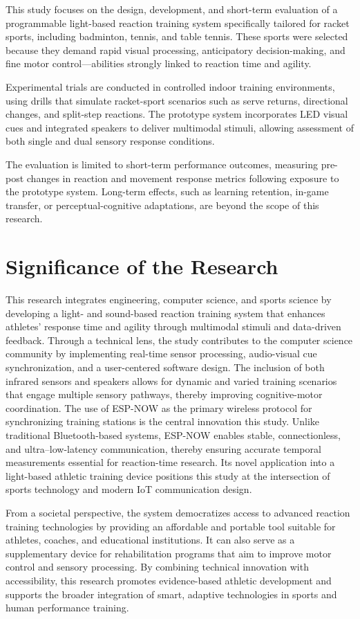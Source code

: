 	This study focuses on the design, development, and short-term evaluation of a programmable light-based reaction training system specifically tailored for racket sports, including badminton, tennis, and table tennis. These sports were selected because they demand rapid visual processing, anticipatory decision-making, and fine motor control—abilities strongly linked to reaction time and agility.
	
	Experimental trials are conducted in controlled indoor training environments, using drills that simulate racket-sport scenarios such as serve returns, directional changes, and split-step reactions. The prototype system incorporates LED visual cues and integrated speakers to deliver multimodal stimuli, allowing assessment of both single and dual sensory response conditions.
	
	The evaluation is limited to short-term performance outcomes, measuring pre-post changes in reaction and movement response metrics following exposure to the prototype system. Long-term effects, such as learning retention, in-game transfer, or perceptual-cognitive adaptations, are beyond the scope of this research.


\section{Significance of the Research}
\label{sec:significance}

	This research integrates engineering, computer science, and sports science by developing a light- and sound-based reaction training system that enhances athletes’ response time and agility through multimodal stimuli and data-driven feedback. Through a technical lens, the study contributes to the computer science community by implementing real-time sensor processing, audio-visual cue synchronization, and a user-centered software design. The inclusion of both infrared sensors and speakers allows for dynamic and varied training scenarios that engage multiple sensory pathways, thereby improving cognitive-motor coordination. The use of ESP-NOW as the primary wireless protocol for synchronizing training stations is the central innovation this study. Unlike traditional Bluetooth-based systems, ESP-NOW enables stable, connectionless, and ultra–low-latency communication, thereby ensuring accurate temporal measurements essential for reaction-time research. Its novel application into a light-based athletic training device positions this study at the intersection of sports technology and modern IoT communication design.
	
	From a societal perspective, the system democratizes access to advanced reaction training technologies by providing an affordable and portable tool suitable for athletes, coaches, and educational institutions. It can also serve as a supplementary device for rehabilitation programs that aim to improve motor control and sensory processing. By combining technical innovation with accessibility, this research promotes evidence-based athletic development and supports the broader integration of smart, adaptive technologies in sports and human performance training.
